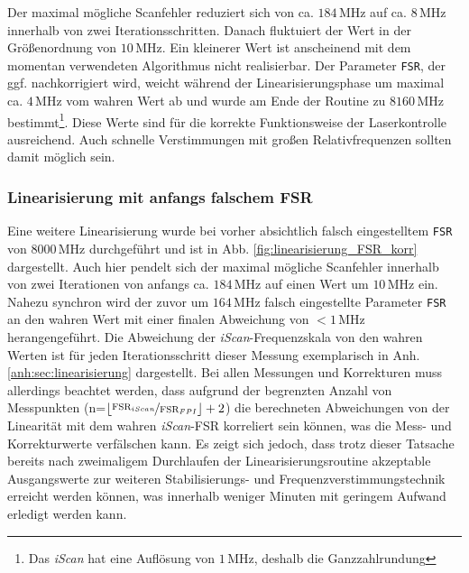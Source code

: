 Der maximal mögliche Scanfehler reduziert sich von
ca. $184\,$MHz auf ca. $8\,$MHz innerhalb von zwei Iterationsschritten. Danach
fluktuiert der Wert in der Größenordnung von $10\,$MHz. Ein kleinerer Wert ist
anscheinend mit dem momentan verwendeten Algorithmus nicht realisierbar. Der
Parameter \lstinline|FSR|, der ggf. nachkorrigiert wird, weicht
während der Linearisierungsphase um maximal ca. $4\,$MHz vom wahren Wert ab und
wurde am Ende der Routine zu $8160\,$MHz bestimmt\footnote{Das \textit{iScan}
hat eine Auflösung von $1\,$MHz, deshalb die Ganzzahlrundung}. Diese Werte sind
für die korrekte Funktionsweise der Laserkontrolle ausreichend. Auch schnelle Verstimmungen mit großen
Relativfrequenzen sollten damit möglich sein.

\subsubsection{Linearisierung mit anfangs falschem
FSR}\label{subsubsec:linearisierung_FSR_korr}
Eine weitere Linearisierung wurde bei vorher absichtlich falsch eingestelltem
\lstinline|FSR| von $8000\,$MHz durchgeführt und ist in Abb.
\ref{fig:linearisierung_FSR_korr} dargestellt. Auch hier pendelt sich der
maximal mögliche Scanfehler innerhalb von zwei Iterationen von anfangs ca.
$184\,$MHz auf einen Wert um $10\,$MHz ein. Nahezu synchron wird der zuvor um
$164\,$MHz falsch eingestellte Parameter \lstinline|FSR| an den wahren Wert
mit einer finalen Abweichung von $<1\,$MHz herangengeführt. Die Abweichung
der \textit{iScan}-Frequenzskala von den wahren Werten ist für jeden
Iterationsschritt dieser Messung exemplarisch in Anh.
\ref{anh:sec:linearisierung} dargestellt. Bei allen Messungen und Korrekturen
muss allerdings beachtet werden, dass aufgrund der begrenzten Anzahl von
Messpunkten (n=$\lfloor\nicefrac{\text{FSR}_{iScan}}{\text{FSR}_{FPI}}\rfloor+2$) die
berechneten Abweichungen von der Linearität mit dem wahren \textit{iScan}-FSR
korreliert sein können, was die Mess- und Korrekturwerte verfälschen kann. Es
zeigt sich jedoch, dass trotz dieser Tatsache bereits nach zweimaligem
Durchlaufen der Linearisierungsroutine akzeptable Ausgangswerte zur weiteren
Stabilisierungs- und Frequenzverstimmungstechnik erreicht werden können, was
innerhalb weniger Minuten mit geringem Aufwand erledigt werden kann.

